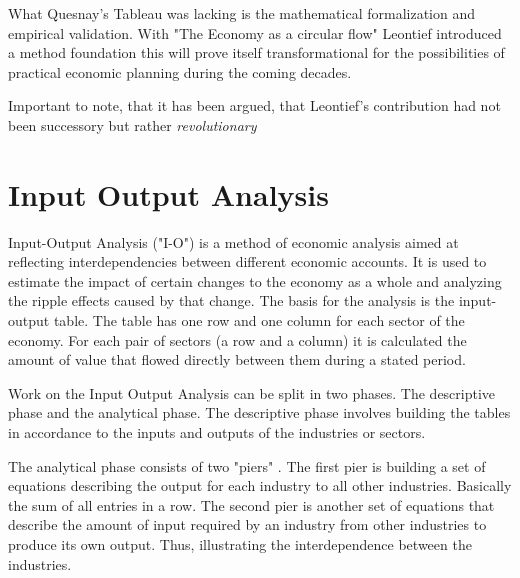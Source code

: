 \documentclass[12pt,a4paper]{scrartcl}
\begin{document}
	What Quesnay's Tableau was lacking is the mathematical formalization and empirical validation.
	With "The Economy as a circular flow" \cite[]{Leontief1991} Leontief introduced a method foundation this will prove itself transformational for the possibilities of practical economic planning during the coming decades.
	
	Important to note, that it has been argued, that Leontief's contribution had not been successory but rather \textit{revolutionary} \cite[pp. 511 - 513]{Baumol2009} \cite[p. 142]{Baumol2000}
	
	
	
		
	
	\section{Input Output Analysis} \label{analysis}

	Input-Output Analysis ("I-O") is a method of economic analysis aimed at reflecting interdependencies between different economic accounts. It is used to estimate the impact of certain changes to the economy as a whole and analyzing the ripple effects caused by that change. The basis for the analysis is the input-output table. The table has one row and one column for each sector of the economy. For each pair of sectors (a row and a column) it is calculated the amount of value that flowed directly between them during a stated period.
	
	Work on the Input Output Analysis can be split in two phases. The descriptive phase and the analytical phase. The descriptive phase involves building the tables in accordance to the inputs and outputs of the industries or sectors.
	
	The analytical phase consists of two "piers" . The first pier is building a set of equations describing the output for each industry to all other industries. Basically the sum of all entries in a row. The second pier is another set of equations that describe the amount of input required by an industry from other industries to produce its own output. Thus, illustrating the interdependence between the industries.
	
\end{document}
